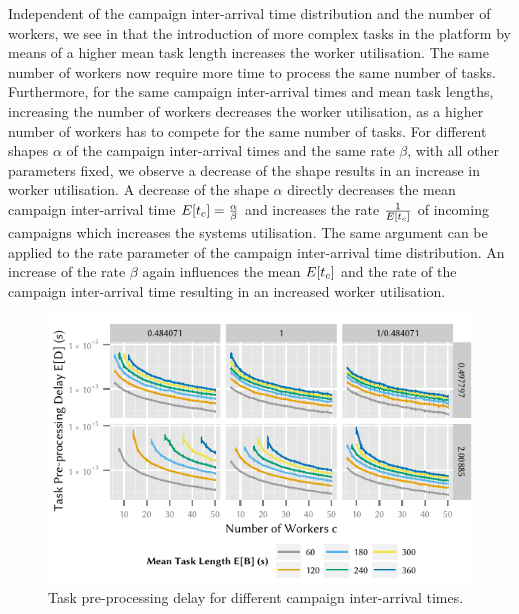Independent of the campaign inter-arrival time distribution and the number of workers, we see in  that the introduction of more complex tasks in the platform by means of a higher mean task length \meanTaskLength increases the worker utilisation.
The same number of workers now require more time to process the same number of tasks.
Furthermore, for the same campaign inter-arrival times and mean task lengths, increasing the number of workers decreases the worker utilisation, as a higher number of workers has to compete for the same number of tasks.
For different shapes \(\alpha\) of the campaign inter-arrival times and the same rate \(\beta\), with all other parameters fixed, we observe a decrease of the shape results in an increase in worker utilisation.
A decrease of the shape \(\alpha\) directly decreases the mean campaign inter-arrival time \(E[t_c]=\frac{\alpha}{\beta}\) and increases the rate \(\frac{1}{E[t_c]}\) of incoming campaigns which increases the systems utilisation. 
The same argument can be applied to the rate parameter of the campaign inter-arrival time distribution. An increase of the rate \(\beta\) again influences the mean \(E[t_c]\) and the rate of the campaign inter-arrival time resulting in an increased worker utilisation.

\begin{figure}
	\centering
	\includegraphics{cloud/crowdsourcing/numerical_evaluation/figures/parameter_task_delay}
	\caption{Task pre-processing delay for different campaign inter-arrival times.}
	\label{fig:cloud:crowdsourcing:performance_evaluation:distributions:parameter_task_delay}
\end{figure}

